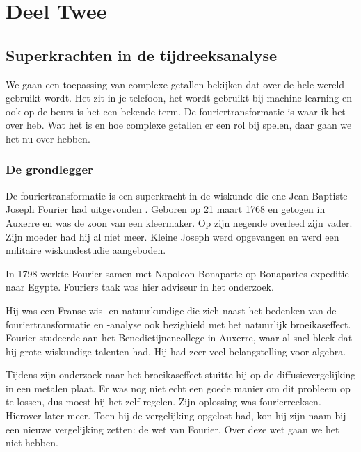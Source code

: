 \documentclass[11pt,fleqn]{book} %
\begin{document}
\part{Deel Twee}



\chapter{Superkrachten in de tijdreeksanalyse}\label{sec:four}

We gaan een toepassing van complexe getallen bekijken dat over de hele wereld gebruikt wordt. Het zit in je telefoon, het wordt gebruikt bij machine learning en ook op de beurs is het een bekende term. De fouriertransformatie is waar ik het over heb. Wat het is en hoe complexe getallen er een rol bij spelen, daar gaan we het nu over hebben.

\section{De grondlegger}

De fouriertransformatie is een superkracht in de wiskunde die ene Jean-Baptiste Joseph Fourier had uitgevonden \cite{jf}. Geboren op 21 maart 1768 en getogen in Auxerre en was de zoon van een kleermaker. Op zijn negende overleed zijn vader. Zijn moeder had hij al niet meer. Kleine Joseph werd opgevangen en werd een militaire wiskundestudie aangeboden.

In 1798 werkte Fourier samen met Napoleon Bonaparte op Bonapartes expeditie naar Egypte. Fouriers taak was hier adviseur in het onderzoek.

Hij was een Franse wis- en natuurkundige die zich naast het bedenken van de fouriertransformatie en -analyse ook bezighield met het natuurlijk broeikaseffect. Fourier studeerde aan het Benedictijnencollege in Auxerre, waar al snel bleek dat hij grote wiskundige talenten had. Hij had zeer veel belangstelling voor algebra.

Tijdens zijn onderzoek naar het broeikaseffect stuitte hij op de diffusievergelijking in een metalen plaat. Er was nog niet echt een goede manier om dit probleem op te lossen, dus moest hij het zelf regelen. Zijn oplossing was fourierreeksen. Hierover later meer. Toen hij de vergelijking opgelost had, kon hij zijn naam bij een nieuwe vergelijking zetten: de wet van Fourier. Over deze wet gaan we het niet hebben.
\end{document}
